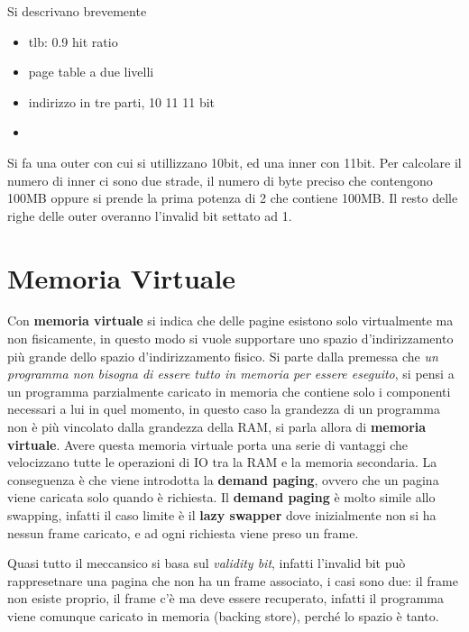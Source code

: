 \documentclass[12pt]{article}
\begin{document}
\begin{example}{}{}
  Si descrivano brevemente 
  \begin{itemize}
    \item tlb: 0.9 hit ratio
    \item page table a due livelli
    \item indirizzo in tre parti, 10 11 11 bit
    \item 
  \end{itemize}
  Si fa una outer con cui si utillizzano 10bit, ed una inner con 11bit. Per calcolare il numero di inner ci sono due strade, il numero di byte preciso che contengono 100MB oppure si prende la prima potenza di 2 che contiene 100MB. Il resto delle righe delle outer overanno l'invalid bit settato ad 1.
\end{example}



\newpage
\section{Memoria Virtuale}
Con \textbf{memoria virtuale} si indica che delle pagine esistono solo virtualmente ma non fisicamente, in questo modo si vuole supportare uno spazio d'indirizzamento pi\`u grande dello spazio d'indirizzamento fisico. Si parte dalla premessa che \emph{un programma non bisogna di essere tutto in memoria per essere eseguito}, si pensi a un programma parzialmente caricato in memoria che contiene solo i componenti necessari a lui in quel momento, in questo caso la grandezza di un programma non \`e pi\`u vincolato dalla grandezza della RAM, si parla allora di \textbf{memoria virtuale}. Avere questa memoria virtuale porta una serie di vantaggi che velocizzano tutte le operazioni di IO tra la RAM e la memoria secondaria. La conseguenza \`e che viene introdotta la \textbf{demand paging}, ovvero che un pagina viene caricata solo quando \`e richiesta. Il \textbf{demand paging} \`e molto simile allo swapping, infatti il caso limite \`e il \textbf{lazy swapper} dove inizialmente non si ha nessun frame caricato, e ad ogni richiesta viene preso un frame.


Quasi tutto il meccansico si basa sul \emph{validity bit}, infatti l'invalid bit pu\`o rappresetnare una pagina che non ha un frame associato, i casi sono due: il frame non esiste proprio, il frame c'\`e ma deve essere recuperato, infatti il programma viene comunque caricato in memoria (backing store), perch\'e lo spazio \`e tanto.

\hfill
\end{document}
